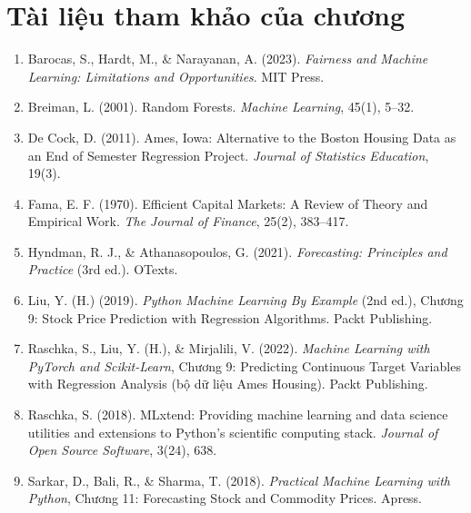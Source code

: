 \section*{Tài liệu tham khảo của chương}
\begin{enumerate}
    \item Barocas, S., Hardt, M., \& Narayanan, A. (2023). \textit{Fairness and Machine Learning: Limitations and Opportunities}. MIT Press.
    \item Breiman, L. (2001). Random Forests. \textit{Machine Learning}, 45(1), 5--32.
    \item De Cock, D. (2011). Ames, Iowa: Alternative to the Boston Housing Data as an End of Semester Regression Project. \textit{Journal of Statistics Education}, 19(3).
    \item Fama, E. F. (1970). Efficient Capital Markets: A Review of Theory and Empirical Work. \textit{The Journal of Finance}, 25(2), 383--417.
    \item Hyndman, R. J., \& Athanasopoulos, G. (2021). \textit{Forecasting: Principles and Practice} (3rd ed.). OTexts.
    \item Liu, Y. (H.) (2019). \textit{Python Machine Learning By Example} (2nd ed.), Chương 9: Stock Price Prediction with Regression Algorithms. Packt Publishing.
    \item Raschka, S., Liu, Y. (H.), \& Mirjalili, V. (2022). \textit{Machine Learning with PyTorch and Scikit-Learn}, Chương 9: Predicting Continuous Target Variables with Regression Analysis (bộ dữ liệu Ames Housing). Packt Publishing.
    \item Raschka, S. (2018). MLxtend: Providing machine learning and data science utilities and extensions to Python's scientific computing stack. \textit{Journal of Open Source Software}, 3(24), 638.
    \item Sarkar, D., Bali, R., \& Sharma, T. (2018). \textit{Practical Machine Learning with Python}, Chương 11: Forecasting Stock and Commodity Prices. Apress.
\end{enumerate}
